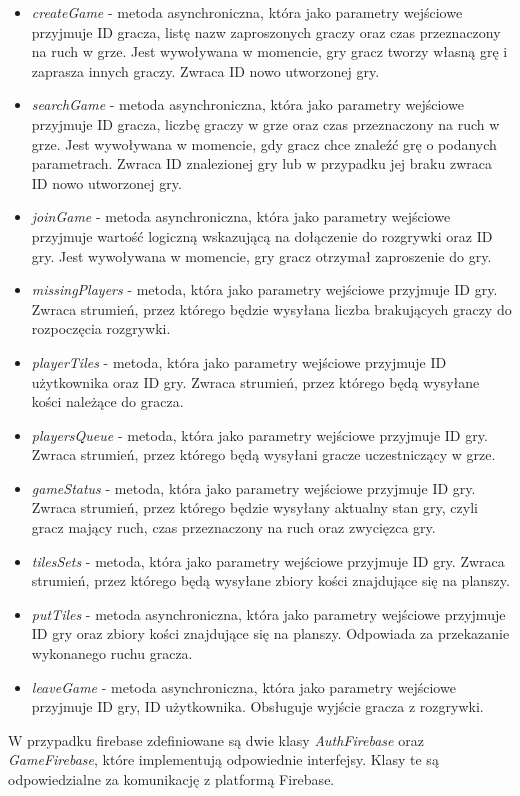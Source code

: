 \begin{itemize}
	\item \emph{createGame} - metoda asynchroniczna, która jako parametry wejściowe przyjmuje ID gracza, listę nazw zaproszonych graczy oraz czas przeznaczony na ruch w grze. Jest wywoływana w momencie, gry gracz tworzy własną grę i zaprasza innych graczy. Zwraca ID nowo utworzonej gry.
	\item \emph{searchGame} - metoda asynchroniczna, która jako parametry wejściowe przyjmuje ID gracza, liczbę graczy w grze oraz czas przeznaczony na ruch w grze. Jest wywoływana w momencie, gdy gracz chce znaleźć grę o podanych parametrach. Zwraca ID znalezionej gry lub w przypadku jej braku zwraca ID nowo utworzonej gry.
	\item \emph{joinGame} - metoda asynchroniczna, która jako parametry wejściowe przyjmuje wartość logiczną wskazującą na dołączenie do rozgrywki oraz ID gry. Jest wywoływana w momencie, gry gracz otrzymał zaproszenie do gry.
	\item \emph{missingPlayers} - metoda, która jako parametry wejściowe przyjmuje ID gry. Zwraca strumień, przez którego będzie wysyłana liczba brakujących graczy do rozpoczęcia rozgrywki.
	\item \emph{playerTiles} - metoda, która jako parametry wejściowe przyjmuje ID użytkownika oraz ID gry. Zwraca strumień, przez którego będą wysyłane kości należące do gracza.
	\item \emph{playersQueue} - metoda, która jako parametry wejściowe przyjmuje ID gry. Zwraca strumień, przez którego będą wysyłani gracze uczestniczący w grze.
	\item \emph{gameStatus} - metoda, która jako parametry wejściowe przyjmuje ID gry. Zwraca strumień, przez którego będzie wysyłany aktualny stan gry, czyli gracz mający ruch, czas przeznaczony na ruch oraz zwycięzca gry.
	\item \emph{tilesSets} - metoda, która jako parametry wejściowe przyjmuje ID gry. Zwraca strumień, przez którego będą wysyłane zbiory kości znajdujące się na planszy.
	\item \emph{putTiles} - metoda asynchroniczna, która jako parametry wejściowe przyjmuje ID gry oraz zbiory kości znajdujące się na planszy. Odpowiada za przekazanie wykonanego ruchu gracza.
	\item \emph{leaveGame} - metoda asynchroniczna, która jako parametry wejściowe przyjmuje ID gry, ID użytkownika. Obsługuje wyjście gracza z rozgrywki.	\\
\end{itemize}
W przypadku firebase zdefiniowane są dwie klasy \emph{AuthFirebase} oraz \emph{GameFirebase}, które implementują odpowiednie interfejsy. Klasy te są odpowiedzialne za komunikację z platformą Firebase. \\

